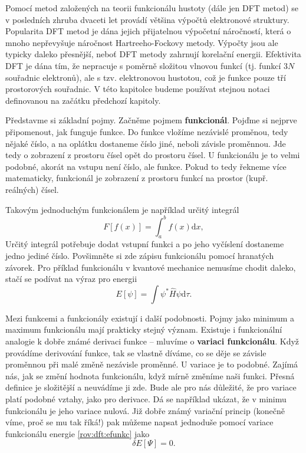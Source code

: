 Pomocí metod založených na teorii funkcionálu hustoty (dále jen DFT metod) se v posledních zhruba dvaceti let provádí většina výpočtů elektronové struktury. Popularita DFT metod je dána jejich přijatelnou výpočetní náročností, která o mnoho nepřevyšuje náročnost Hartreeho-Fockovy 
metody. Výpočty jsou ale typicky daleko přesnější, neboť DFT metody zahrnují korelační energii. Efektivita DFT je dána tím, že nepracuje s poměrně složitou vlnovou funkcí (tj. funkcí 3$N$ souřadnic elektronů), ale s tzv. elektronovou hustotou, což je funkce pouze tří prostorových souřadnic. 
V této kapitolce budeme používat stejnou notaci definovanou na začátku předchozí kapitoly.

Představme si základní pojmy. Začněme pojmem \textbf{funkcionál}. Pojďme si nejprve připomenout, jak funguje funkce. Do funkce vložíme nezávislé proměnou, tedy nějaké číslo, a na oplátku dostaneme číslo jiné, neboli závisle proměnnou. Jde tedy o zobrazení z prostoru čísel opět do prostoru čísel. U funkcionálu je to velmi podobné, akorát na vstupu není číslo, ale funkce. Pokud to tedy řekneme více matematicky, funkcionál je zobrazení z prostoru funkcí na prostor (kupř. reálných) čísel.

Takovým jednoduchým funkcionálem je například určitý integrál
$$
F[f(x)] = \int_a^b f(x) \mathrm{d}x, 
$$
Určitý integrál potřebuje dodat vstupní funkci a po jeho vyčíslení dostaneme jedno jediné číslo. Povšimněte si zde zápisu funkcionálu pomocí hranatých závorek.  
Pro příklad funkcionálu v kvantové mechanice nemusíme chodit daleko, stačí se podívat na výraz pro energii
$$
E[\psi] = \int \psi^*\hat{H}\psi \mathrm{d}\tau .
\label{rov:dft:efunkc}
$$


Mezi funkcemi a funkcionály existují i další podobnosti. Pojmy jako minimum a maximum funkcionálu mají prakticky stejný význam. Existuje i funkcionální analogie k dobře známé derivaci funkce -- mluvíme o \textbf{variaci funkcionálu}.
Když provádíme derivování funkce, tak se vlastně díváme, co se děje se závisle proměnnou při malé změně nezávisle proměnné.
U variace je to podobné. Zajímá nás, jak se změní hodnota funkcionálu, když mírně změníme naši funkci. Přesná definice je složitější a neuvádíme ji zde. Bude ale pro nás důležité, že pro variace platí podobné vztahy, jako pro derivace. Dá se například ukázat, že v minimu funkcionálu je jeho variace nulová. Již dobře známý variační princip (konečně víme, proč se mu tak říká!) pak můžeme napsat jednoduše pomocí variace funkcionálu energie \eqref{rov:dft:efunkc} jako
\begin{equation}
\delta E[\Psi] = 0 .
\label{rov:dft:varprincip}
\end{equation}

